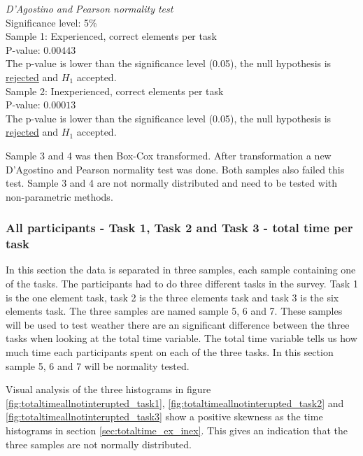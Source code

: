 \begin{center}
	\begin{tcolorbox}[box align=center,width=\textwidth-5cm]
		\centering
		\textit{D'Agostino and Pearson normality test}\\
		Significance level: 5\%  \\[0.5cm]
		
		Sample 1: Experienced, correct elements per task\\
		P-value: $0.00443$\\
		The p-value is lower than the significance level (0.05), the null hypothesis is \underline{rejected} and $H_1$ accepted.\\[0.5cm]
		
		Sample 2: Inexperienced, correct elements per task \\
		P-value: $0.00013$ \\
		The p-value is lower than the significance level (0.05), the null hypothesis is \underline{rejected} and $H_1$ accepted.\\[0.5cm]
	\end{tcolorbox} 
\end{center}


Sample 3 and 4 was then Box-Cox transformed. After transformation a new D'Agostino and Pearson normality test was done. Both samples also failed this test. Sample 3 and 4 are not normally distributed and need to be tested with non-parametric methods. 

\subsubsection[Sample 5, 6 and 7]{All participants - Task 1, Task 2 and Task 3 - total time per task}\label{sec:task123_time}

In this section the data is separated in three samples, each sample containing one of the tasks. The participants had to do three different tasks in the survey. Task 1 is the one element task, task 2 is the three elements task and task 3 is the six elements task. The three samples are named sample 5, 6 and 7. These samples will be used to test weather there are an significant difference between the three tasks when looking at the total time variable. The total time variable tells us how much time each participants spent on each of the three tasks. In this section sample 5, 6 and 7 will be normality tested. 
 
 Visual analysis of the three histograms in figure \ref{fig:totaltimeallnotinterupted_task1}, \ref{fig:totaltimeallnotinterupted_task2} and \ref{fig:totaltimeallnotinterupted_task3} show a positive skewness as the time histograms in section \ref{sec:totaltime_ex_inex}. This gives an indication that the three samples are not normally distributed. 

